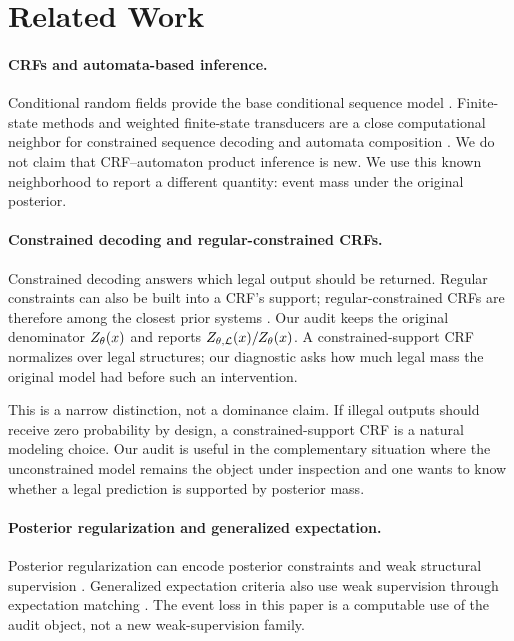 \section{Related Work}

\paragraph{CRFs and automata-based inference.}
Conditional random fields provide the base conditional sequence model
\citep{lafferty2001crf}.  Finite-state methods and weighted finite-state
transducers are a close computational neighbor for constrained sequence
decoding and automata composition \citep{mohri2002wfst}.  We do not claim that
CRF--automaton product inference is new.  We use this known neighborhood to
report a different quantity: event mass under the original posterior.

\paragraph{Constrained decoding and regular-constrained CRFs.}
Constrained decoding answers which legal output should be returned.  Regular
constraints can also be built into a CRF's support; regular-constrained CRFs
are therefore among the closest prior systems \citep{papay2022constraining}.
Our audit keeps the original denominator \(Z_{\theta}(x)\) and reports
\(Z_{\theta,\mathcal{L}}(x)/Z_{\theta}(x)\).  A constrained-support CRF normalizes
over legal structures; our diagnostic asks how much legal mass the original
model had before such an intervention.

This is a narrow distinction, not a dominance claim.  If illegal outputs should
receive zero probability by design, a constrained-support CRF is a natural
modeling choice.  Our audit is useful in the complementary situation where the
unconstrained model remains the object under inspection and one wants to know
whether a legal prediction is supported by posterior mass.

\paragraph{Posterior regularization and generalized expectation.}
Posterior regularization can encode posterior constraints and weak structural
supervision \citep{ganchev2010posterior}.  Generalized expectation criteria
also use weak supervision through expectation matching \citep{mann2010ge}.  The
event loss in this paper is a computable use of the audit object, not a new
weak-supervision family.

